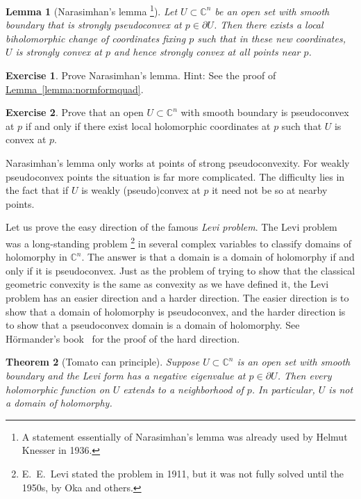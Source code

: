 \documentclass[12pt,openany]{book}
\newcommand{\C}{{\mathbb{C}}}
\newcommand{\myindex}[1]{#1\index{#1}}
\theoremstyle{plain}
\newtheorem{thm}{Theorem}[section]
\newtheorem{lemma}[thm]{Lemma}
\theoremstyle{remark}
\theoremstyle{definition}
\newenvironment{exbox}{%
    \def\FrameCommand{\vrule width 1pt \relax\hspace{10pt}}%
    \MakeFramed{\advance\hsize-\width\FrameRestore}%
}{%
    \endMakeFramed
}
\theoremstyle{exercise}
\newtheorem{exercise}{Exercise}[section]
\theoremstyle{example}
\newcommand{\lemmaref}[1]{\hyperref[#1]{Lemma~\ref*{#1}}}
\begin{document}
\begin{lemma}[Narasimhan's lemma%
\footnote{A statement essentially of Narasimhan's lemma was already used by Helmut
Knesser in 1936.}]
Let $U \subset \C^n$ be an open set with smooth boundary
that is strongly pseudoconvex at $p \in \partial U$.  Then there exists a local biholomorphic change of
coordinates fixing $p$ such that in these new coordinates, $U$ is strongly
convex at $p$ and hence strongly convex at all points near $p$.
\end{lemma}

\begin{exbox}
\begin{exercise}
Prove Narasimhan's lemma.  Hint: See the proof of \lemmaref{lemma:normformquad}.
\end{exercise}

\begin{exercise}
Prove that an open $U \subset \C^n$ with smooth boundary is pseudoconvex at
$p$ if and only if there exist local holomorphic coordinates at $p$ such that
$U$ is convex at $p$.
\end{exercise}
\end{exbox}

Narasimhan's lemma only works at points of strong
pseudoconvexity.  For weakly pseudoconvex points the situation is far more
complicated.  The difficulty lies in the fact that if
$U$ is weakly (pseudo)convex at $p$ it need not be so
at nearby points.

\medskip


Let us prove the easy direction of the famous
\emph{\myindex{Levi problem}}.  The Levi problem was a long-standing
problem%
\footnote{E.\ E.\ Levi stated the problem in 1911, but it was not fully
solved until the 1950s, by Oka and others.}
in several complex variables to classify domains of holomorphy in
$\C^n$.  The answer is that a domain is a domain of holomorphy if and only
if it is pseudoconvex.  Just as the problem of trying to show that
the classical geometric convexity is the same as convexity as we have
defined it,
the Levi problem has an easier direction and a harder direction.
The easier direction is to show that a domain of holomorphy is pseudoconvex, and
the harder direction is to show that a pseudoconvex domain is a domain of
holomorphy.  See H\"ormander's book~\cite{Hormander} for the proof
of the hard direction.

\begin{thm}[Tomato can principle] \label{thm:tomatocan}
Suppose
$U \subset \C^n$ is an open set with smooth boundary and
the Levi form has a negative eigenvalue at $p \in
\partial U$.
Then every holomorphic function on $U$
extends to a neighborhood of $p$.
In particular, $U$ is not
a domain of holomorphy.
\end{thm}
\end{document}
